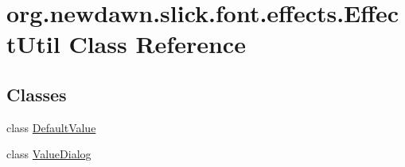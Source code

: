 \hypertarget{classorg_1_1newdawn_1_1slick_1_1font_1_1effects_1_1_effect_util}{}\section{org.\+newdawn.\+slick.\+font.\+effects.\+Effect\+Util Class Reference}
\label{classorg_1_1newdawn_1_1slick_1_1font_1_1effects_1_1_effect_util}
\subsection*{Classes}
\begin{DoxyCompactItemize}
\item 
class \mbox{\hyperlink{classorg_1_1newdawn_1_1slick_1_1font_1_1effects_1_1_effect_util_1_1_default_value}{Default\+Value}}
\item 
class \mbox{\hyperlink{classorg_1_1newdawn_1_1slick_1_1font_1_1effects_1_1_effect_util_1_1_value_dialog}{Value\+Dialog}}
\end{DoxyCompactItemize}
